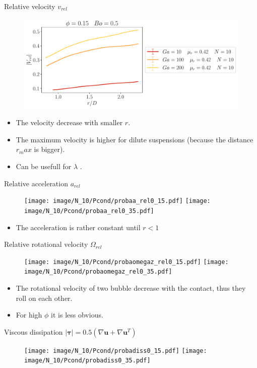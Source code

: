 \documentclass[aspectratio=169]{beamer}
\begin{document}
\begin{frame}
  {Relative velocity $v_{rel}$}
  \begin{figure}
    \centering
    \includegraphics[height=  0.25\textwidth]{image/N_10/Pcond/probav_rel0_15Bo_0_5.pdf}
  \end{figure}
  \begin{itemize}
    \item The velocity decrease with smaller $r$. 
    \item The maximum velocity is higher for dilute suspensions (because the distance $r_max$ is bigger). 
    \item Can be usefull for $\lambda$ . 
  \end{itemize} 
\end{frame}
\begin{frame}
  {Relative acceleration $a_{rel}$}
  \begin{figure}
    \centering
    \texttt{[image: image/N\_10/Pcond/probaa\_rel0\_15.pdf]}
    \texttt{[image: image/N\_10/Pcond/probaa\_rel0\_35.pdf]}
  \end{figure}
  \begin{itemize}
    \item The acceleration is rather constant until $r<1$
  \end{itemize}
\end{frame}
\begin{frame}
  {Relative rotational velocity $\Omega_{rel}$}
  \begin{figure}
    \centering
    \texttt{[image: image/N\_10/Pcond/probaomegaz\_rel0\_15.pdf]}
    \texttt{[image: image/N\_10/Pcond/probaomegaz\_rel0\_35.pdf]}
  \end{figure}
  \begin{itemize}
    \item The rotational velocity of two bubble decrease with the contact, thus they roll on each other.
    \item For high $\phi$ it is less obvious. 
  \end{itemize}
\end{frame}
\begin{frame}
  {Viscous dissipation $|\bm{\tau}| = 0.5\left(\nabla \bm{u}+\nabla \bm{u}^T\right)$}
  \begin{figure}
    \centering
    \texttt{[image: image/N\_10/Pcond/probadiss0\_15.pdf]}
    \texttt{[image: image/N\_10/Pcond/probadiss0\_35.pdf]}
  \end{figure}
\end{frame}
\end{document}
